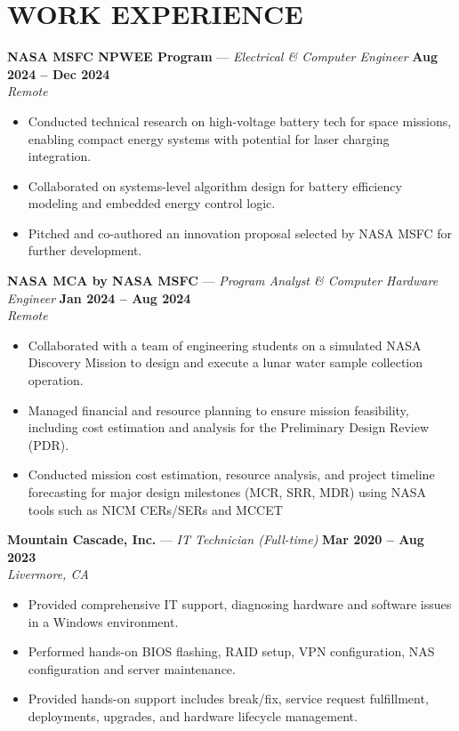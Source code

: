 \documentclass[letterpaper,11pt]{article}
\begin{document}
\section{WORK EXPERIENCE}
\textbf{NASA MSFC NPWEE Program} — \textit{Electrical \& Computer Engineer }\hfill \textbf{Aug 2024 -- Dec 2024} \\
\textit{Remote}
\begin{itemize}
    \item Conducted technical research on high-voltage battery tech for space missions, enabling compact energy systems with potential for laser charging integration.
    \item Collaborated on systems-level algorithm design for battery efficiency modeling and embedded energy control logic.
    \item Pitched and co-authored an innovation proposal selected by NASA MSFC for further development.
\end{itemize}
\textbf{NASA MCA by NASA MSFC} — \textit{Program Analyst \&  Computer Hardware Engineer} \hfill \textbf{Jan 2024 -- Aug 2024} \\
\textit{Remote}
\begin{itemize}
    \item Collaborated with a team of engineering students on a simulated NASA Discovery Mission to design and execute a lunar water sample collection operation.
    \item Managed financial and resource planning to ensure mission feasibility, including cost estimation and analysis for the Preliminary Design Review (PDR). 
    \item Conducted mission cost estimation, resource analysis, and project timeline forecasting for major design milestones (MCR, SRR, MDR) using NASA tools such as NICM CERs/SERs and MCCET
\end{itemize}
\textbf{Mountain Cascade, Inc.} — \textit{IT Technician (Full-time)} \hfill \textbf{Mar 2020 -- Aug 2023} \\
\textit{Livermore, CA}
\begin{itemize}
    \item Provided comprehensive IT support, diagnosing hardware and software issues in a Windows environment.
    \item Performed hands-on BIOS flashing, RAID setup, VPN configuration, NAS configuration and server maintenance.
    \item Provided hands-on support includes break/fix, service request fulfillment, deployments, upgrades, and hardware lifecycle management.
\end{itemize}
\end{document}
